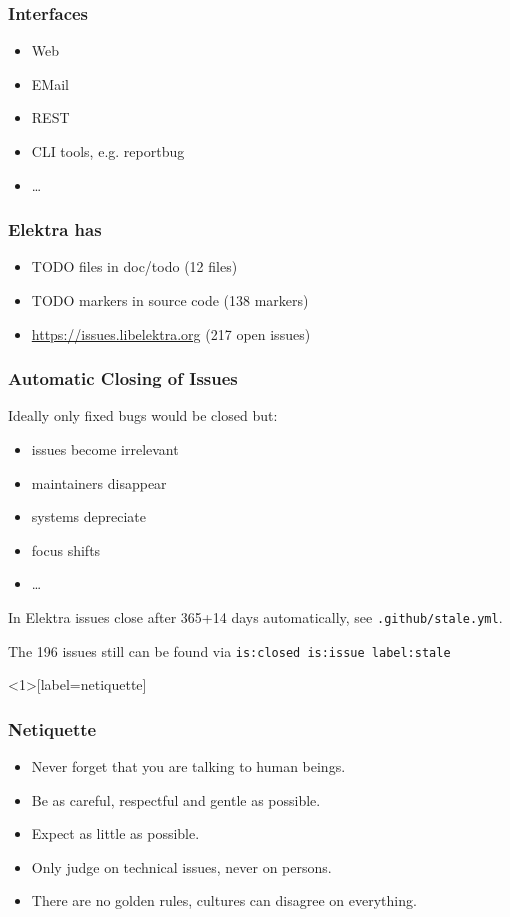 \begin{frame}
	\frametitle{Interfaces}

	\begin{itemize}
		\item Web
		\item EMail
		\item REST
		\item CLI tools, e.g. reportbug
		\item \dots
	\end{itemize}
\end{frame}

\begin{frame}
	\frametitle{Elektra has}
	\begin{itemize}
		\item TODO files in doc/todo (12 files)
		\item TODO markers in source code (138 markers)
		\item \url{https://issues.libelektra.org} (217 open issues)
	\end{itemize}
\end{frame}

\begin{frame}[fragile]
	\frametitle{Automatic Closing of Issues}

	Ideally only fixed bugs would be closed but:
	\begin{itemize}
		\item issues become irrelevant
		\item maintainers disappear
		\item systems depreciate
		\item focus shifts
		\item \dots
	\end{itemize}
	\vspace{1cm}

	In Elektra issues close after 365+14 days automatically, see
	\verb+.github/stale.yml+.

	\vspace{1cm}
	The 196 issues still can be found via \verb+is:closed is:issue label:stale+
\end{frame}

\begin{frame}<1>[label=netiquette]
	\frametitle{Netiquette}

	\begin{itemize}
		\item Never forget that you are talking to human beings.
		\item Be as careful, respectful and gentle as possible.
		\item Expect as little as possible.
		\item Only judge on technical issues, never on persons.
		\item There are no golden rules, cultures can disagree on everything.
	\end{itemize}

\end{frame}

